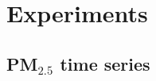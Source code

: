 \documentclass[notheorems,envcountsect,allowframebreaks,xcolor=svgnames,8pt]{beamer}
\begin{document}

\section{Experiments}
\subsection{PM$_{2.5}$ time series}
\end{document}
